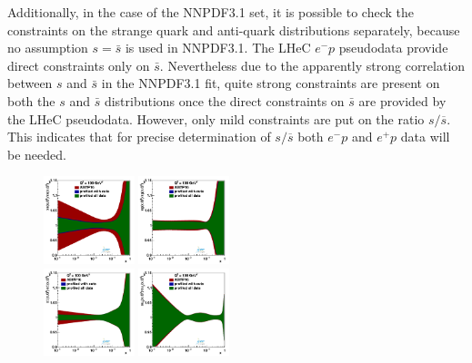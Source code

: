 \documentclass[pdftex,twocolumn,epjc3]{svjour3}          %
\newcommand\new[1]{{\color{blue} #1}}
\begin{document}
\new{
Additionally, in the case of the NNPDF3.1 set, it is possible to check 
the constraints on the strange quark and anti-quark distributions 
separately, because no assumption $s=\bar{s}$ is used in NNPDF3.1. 
The LHeC $e^{-}p$ pseudodata provide direct constraints only on $\bar{s}$. 
Nevertheless due to the apparently strong correlation between $s$ and 
$\bar{s}$ in the NNPDF3.1 fit, quite strong constraints are present on both 
the $s$ and $\bar{s}$ distributions once the direct constraints on $\bar{s}$ 
are provided by the LHeC pseudodata. However, only mild constraints 
are put on the ratio $s/\overline{s}$. This indicates that for precise 
determination of $s/\overline{s}$ both $e^{-}p$ and $e^{+}p$ data will be needed.

\begin{figure}
  \centering
  {{\includegraphics[width=0.235\textwidth]{pics/pdf-profile-ffabm/q2_100_pdf_sq_ratio.pdf}}}
  {{\includegraphics[width=0.235\textwidth]{pics/pdf-profile-ffabm/q2_100_pdf_g_ratio.pdf}}}\\
  {{\includegraphics[width=0.235\textwidth]{pics/pdf-profile-ffabm/q2_100_pdf_Sea_ratio.pdf}}}
  {{\includegraphics[width=0.235\textwidth]{pics/pdf-profile-ffabm/q2_100_pdf_uv_ratio.pdf}}}

\end{figure}}
\end{document}
